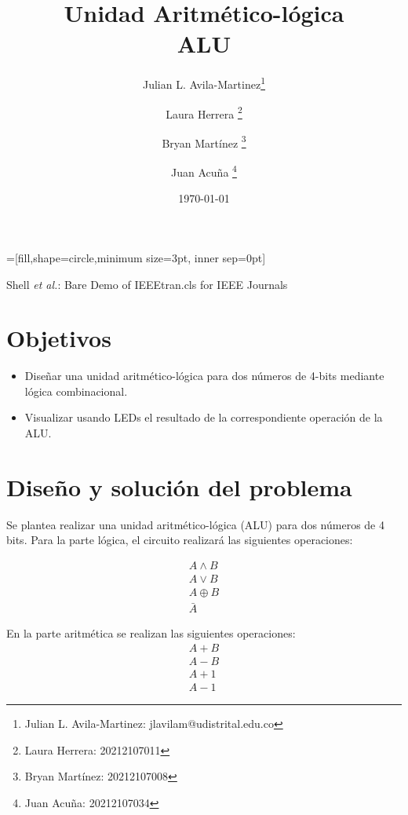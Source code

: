 \documentclass[journal, table]{IEEEtran}
\begin{document}
=[fill,shape=circle,minimum size=3pt, inner sep=0pt]

\title{\textbf{Unidad Aritmético-lógica} \\ \small{ALU}}

\author[*]{Julian L. Avila-Martinez\thanks{Julian L. Avila-Martinez: jlavilam@udistrital.edu.co}}
\author[*]{Laura Herrera
    \thanks{Laura Herrera: 20212107011}}
\author[*]{Bryan Martínez
    \thanks{Bryan Martínez: 20212107008}}
\author[*]{Juan Acuña
    \thanks{Juan Acuña: 20212107034}}


\date{\today}

\markboth{}
{Shell \MakeLowercase{\textit{et al.}}: Bare Demo of IEEEtran.cls for IEEE Journals}

\maketitle

\section{Objetivos}
\begin{itemize}
    \item Diseñar una unidad aritmético-lógica para dos números de 4-bits mediante lógica combinacional.
    \item Visualizar usando LEDs el resultado de la correspondiente operación de la ALU.
\end{itemize}

\section{Diseño y solución del problema}
Se plantea realizar una unidad aritmético-lógica (ALU) para dos números de 4 bits.
Para la parte lógica, el circuito realizará las siguientes operaciones:

\begin{gather}
    A \land B \\
    A \lor B \\
    A \oplus B \\
    \bar{A}
\end{gather}

En la parte aritmética se realizan las siguientes operaciones:
\begin{gather}
    A+B \\
    A-B \\
    A+1 \\
    A-1
\end{gather}
\end{document}
